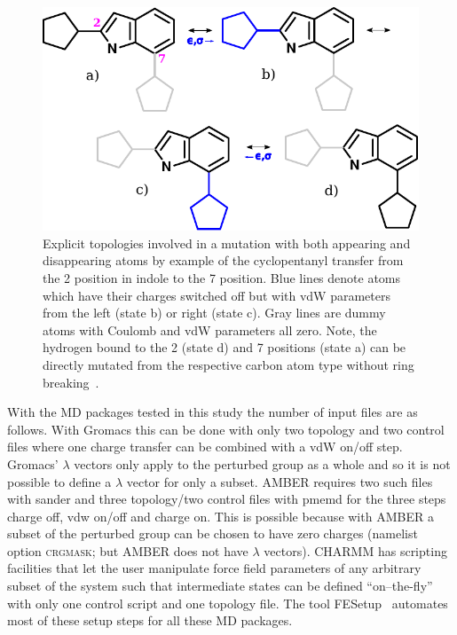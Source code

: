\documentclass[journal=jctcce,manuscript=suppinfo]{achemso}
\begin{document}
\begin{figure}[ht]
\includegraphics[scale=1.0]{figures/dummies2.pdf}
\caption{Explicit topologies involved in a mutation with both
  appearing and disappearing atoms by example of the cyclopentanyl
  transfer from the 2 position in indole to the 7 position.  Blue
  lines denote atoms which have their charges switched off but with
  vdW parameters from the left (state b) or right (state c). Gray
  lines are dummy atoms with Coulomb and vdW parameters all zero.
  Note, the hydrogen bound to the 2 (state d) and 7 positions (state
  a) can be directly mutated from the respective carbon atom type
  without ring breaking~\cite{doi:10.1021/acs.jcim.5b00057}.}
\label{fig:dummies2}
\end{figure}

With the MD packages tested in this study the number of input files
are as follows.  With Gromacs this can be done with only two topology
and two control files where one charge transfer can be combined with a
vdW on/off step.  Gromacs' $\lambda$ vectors only apply to the
perturbed group as a whole and so it is not possible to define a
$\lambda$ vector for only a subset.  AMBER requires two such files
with sander and three topology/two control files with pmemd for the
three steps charge off, vdw on/off and charge on.  This is possible because
with AMBER a subset of the perturbed group can be chosen to have zero
charges (namelist option \textsc{crgmask}; but AMBER does not have $\lambda$ 
vectors).  CHARMM has scripting facilities that let the user manipulate force 
field parameters of any arbitrary subset of the system such that
intermediate states can be defined ``on--the-fly'' with only one
control script and one topology file.  The tool
FESetup~\cite{loeffler_fesetup:_2015} automates most of these setup
steps for all these MD packages.
\end{document}
